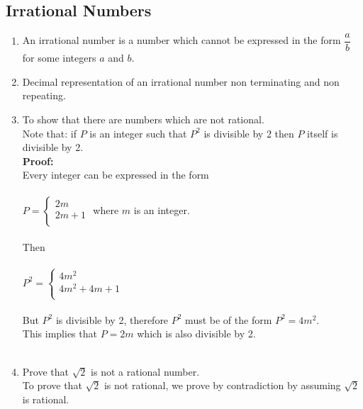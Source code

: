 \documentclass[11pt,a4paper]{article}
\begin{document}
\subsection{Irrational Numbers}
\begin{enumerate}
\item[$\bullet$] An irrational number is a number which cannot be expressed in the form $\dfrac{a}{b}$ for some integers $a$ and $b$.
\item[$\bullet$] Decimal representation of an irrational number non terminating and non repeating.
\item[$\bullet$] To show that there are numbers which are not rational.\\
Note that: if $P$ is an integer such that $P^2$ is divisible by 2 then $P$ itself is divisible by 2.\\

\textbf{Proof:}\\
Every integer can be expressed in the form\\\\
$P =
\begin{cases}
2m\\
2m+1\\
\end{cases}
$ where $m$ is an integer.\\\\
Then\\\\
$P^2=
\begin{cases}
4m^2\\
4m^2+4m+1\\
\end{cases}
$\\\\

But $P^2$ is divisible by 2, therefore $P^2$ must be of the form $P^2=4m^2$.\\ This implies that $P=2m$ which is also divisible by 2.\\\\

\item[$\bullet$] Prove that $\sqrt{2}$ is not a rational number.\\ To prove that $\sqrt{2}$ is not rational, we prove by contradiction by assuming $\sqrt{2}$ is rational.\\


\end{enumerate}
\end{document}
